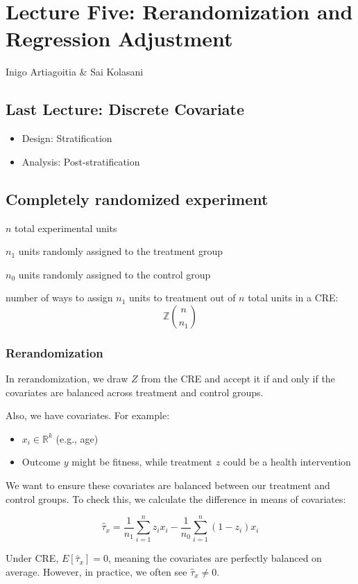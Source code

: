 \section{Lecture Five: Rerandomization and Regression Adjustment}{Inigo Artiagoitia \& Sai Kolasani}
\subsection{Last Lecture: Discrete Covariate}
    \begin{itemize}
        \item Design: Stratification
        \end{itemize}
    \begin{itemize}
        \item Analysis: Post-stratification
    \end{itemize}
\subsection{Completely randomized experiment}
$n$ total experimental units

$n_1$ units randomly assigned to the treatment group

$n_0$ units randomly assigned to the control group

number of ways to assign $n_1$ units to treatment out of $n$ total units in a CRE:
$$\mathbb{Z}\binom{n}{n_1}$$
\subsubsection{Rerandomization}

In rerandomization, we draw $Z$ from the CRE and accept it if and only if the covariates are balanced across treatment and control groups.

Also, we have covariates. For example:
\begin{itemize}
    \item $x_i \in \mathbb{R}^k$ (e.g., age)
    \item Outcome $y$ might be fitness, while treatment $z$ could be a health intervention
\end{itemize}

We want to ensure these covariates are balanced between our treatment and control groups. To check this, we calculate the difference in means of covariates:

\[
\hat{\tau}_x = \frac{1}{n_1} \sum_{i=1}^n z_i x_i - \frac{1}{n_0} \sum_{i=1}^n (1-z_i) x_i
\]

Under CRE, $E[\hat{\tau}_x] = 0$, meaning the covariates are perfectly balanced on average. However, in practice, we often see $\hat{\tau}_x \neq 0$.


